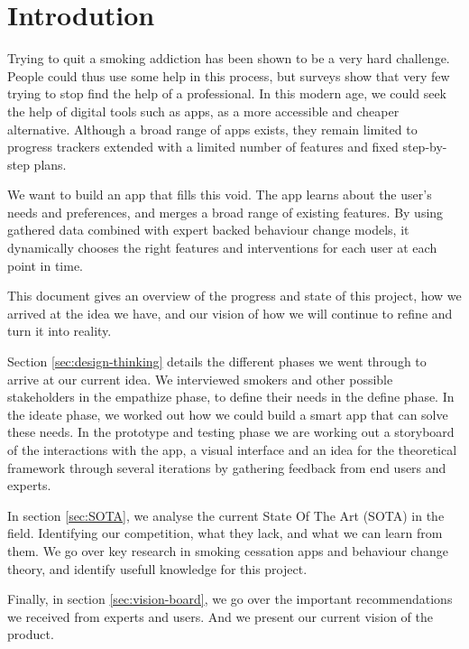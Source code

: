 \section{Introdution}

Trying to quit a smoking addiction has been shown to be a very hard challenge. 
People could thus use some help in this process, but surveys show that very few trying to stop find the help of a professional.
In this modern age, we could seek the help of digital tools such as apps, as a more accessible and cheaper alternative.
Although a broad range of apps exists, they remain limited to progress trackers extended with a limited number of features and fixed step-by-step plans.

We want to build an app that fills this void. The app learns about the user's needs and preferences, and merges a broad range of existing features.
By using gathered data combined with expert backed behaviour change models, it dynamically chooses the right features and interventions for each user at each point in time.

This document gives an overview of the progress and state of this project,
how we arrived at the idea we have, and our vision of how we will continue to refine and turn it into reality.

Section \ref{sec:design-thinking} details the different phases we went through to arrive at our current idea.
We interviewed smokers and other possible stakeholders in the empathize phase, to define their needs in the define phase.
In the ideate phase, we worked out how we could build a smart app that can solve these needs.
In the prototype and testing phase we are working out a storyboard of the interactions with the app, a visual interface and
an idea for the theoretical framework through several iterations by gathering feedback from end users and experts.

In section \ref{sec:SOTA}, we analyse the current State Of The Art (SOTA) in the field.
Identifying our competition, what they lack, and what we can learn from them. 
We go over key research in smoking cessation apps and behaviour change theory, 
and identify usefull knowledge for this project.

Finally, in section \ref{sec:vision-board}, 
we go over the important recommendations we received from experts and users. 
And we present our current vision of the product.



